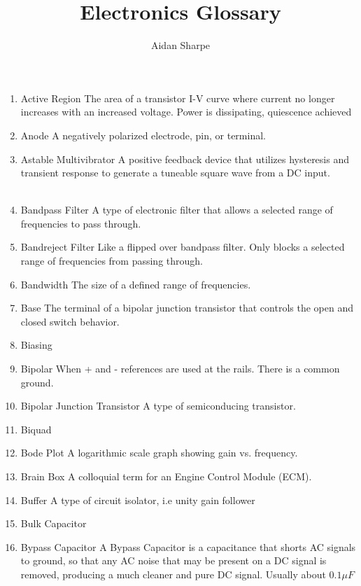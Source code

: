 \documentclass{IEEEtran}
\title{Electronics Glossary}
\author{Aidan Sharpe}
\begin{document}
\maketitle

\begin{enumerate}
\item Active Region
  \subitem The area of a transistor I-V curve where current no longer increases with an increased voltage. Power is dissipating, quiescence achieved \\
\item Anode
  \subitem A negatively polarized electrode, pin, or terminal.\\
\item Astable Multivibrator
  \subitem A positive feedback device that utilizes hysteresis and transient response to generate a tuneable square wave from a DC input. \\

\\
\item Bandpass Filter
  \subitem A type of electronic filter that allows a selected range of frequencies to pass through. \\
\item Bandreject Filter
  \subitem Like a flipped over bandpass filter. Only blocks a selected range of frequencies from passing through. \\
\item Bandwidth
  \subitem The size of a defined range of frequencies.
\item Base
  \subitem The terminal of a bipolar junction transistor that controls the open and closed switch behavior.\\
\item Biasing
\item Bipolar
  \subitem When + and - references are used at the rails. There is a common ground. 
\item Bipolar Junction Transistor
  \subitem A type of semiconducing transistor.\\
\item Biquad
  \subitem \\ 
\item Bode Plot
  \subitem A logarithmic scale graph showing gain vs. frequency. 
\item Brain Box
  \subitem A colloquial term for an Engine Control Module (ECM).\\ 
\item Buffer
  \subitem A type of circuit isolator, i.e unity gain follower\\
\item Bulk Capacitor
  \subitem \\ 
\item Bypass Capacitor
  \subitem A Bypass Capacitor is a capacitance that shorts AC signals to ground, so that any AC noise that may be present on a DC signal is removed, producing a much cleaner and pure DC signal. Usually about $0.1 \mu F$ \\
\ 


\end{enumerate}
\end{document}
